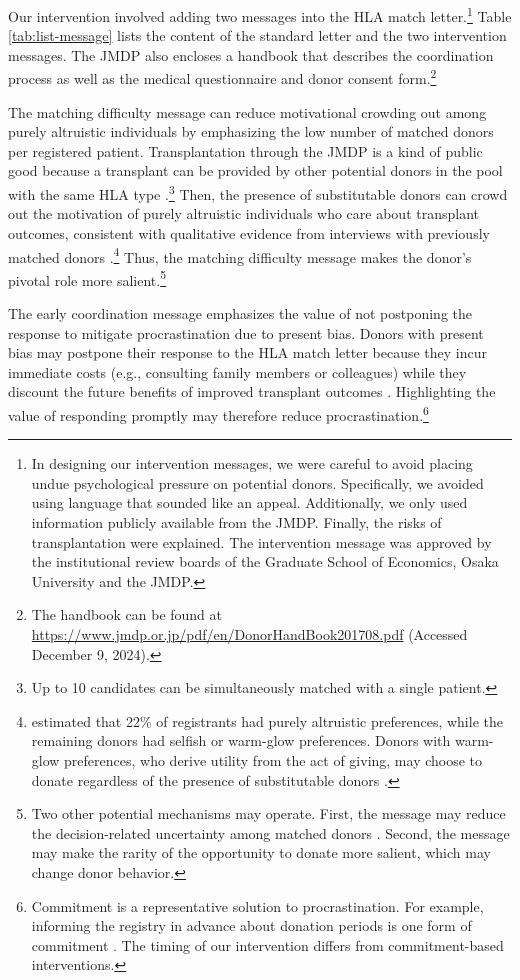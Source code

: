 \documentclass[12pt, a4paper]{article}
\begin{document}
Our intervention involved adding two messages into the HLA match letter.\footnote{In designing our intervention messages, we were careful to avoid placing undue psychological pressure on potential donors. Specifically, we avoided using language that sounded like an appeal. Additionally, we only used information publicly available from the JMDP. Finally, the risks of transplantation were explained. The intervention message was approved by the institutional review boards of the Graduate School of Economics, Osaka University and the JMDP.} Table \ref{tab:list-message} lists the content of the standard letter and the two intervention messages. The JMDP also encloses a handbook that describes the coordination process as well as the medical questionnaire and donor consent form.\footnote{The handbook can be found at \url{https://www.jmdp.or.jp/pdf/en/DonorHandBook201708.pdf} (Accessed December 9, 2024).}

The matching difficulty message can reduce motivational crowding out among purely altruistic individuals by emphasizing the low number of matched donors per registered patient. Transplantation through the JMDP is a kind of public good because a transplant can be provided by other potential donors in the pool with the same HLA type \citep{Bergstrom2009}.\footnote{Up to 10 candidates can be simultaneously matched with a single patient.} Then, the presence of substitutable donors can crowd out the motivation of purely altruistic individuals who care about transplant outcomes, consistent with qualitative evidence from interviews with previously matched donors \citep{Kurosawa2022}.\footnote{\citet{Ohtake2020} estimated that 22\% of registrants had purely altruistic preferences, while the remaining donors had selfish or warm-glow preferences. Donors with warm-glow preferences, who derive utility from the act of giving, may choose to donate regardless of the presence of substitutable donors \citep{Andreoni1990}.} Thus, the matching difficulty message makes the donor's pivotal role more salient.\footnote{Two other potential mechanisms may operate. First, the message may reduce the decision-related uncertainty among matched donors \citep{Exley2016}. Second, the message may make the rarity of the opportunity to donate more salient, which may change donor behavior.}

The early coordination message emphasizes the value of not postponing the response to mitigate procrastination due to present bias. Donors with present bias may postpone their response to the HLA match letter because they incur immediate costs (e.g., consulting family members or colleagues) while they discount the future benefits of improved transplant outcomes \citep{Laibson1997, ODonoghue2001}. Highlighting the value of responding promptly may therefore reduce procrastination.\footnote{Commitment is a representative solution to procrastination. For example, informing the registry in advance about donation periods is one form of commitment \citep{Haylock2024}. The timing of our intervention differs from commitment-based interventions.}
\end{document}

